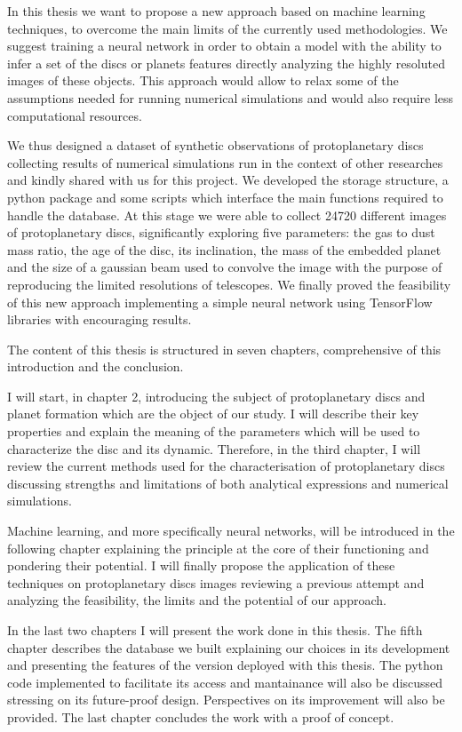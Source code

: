 \documentclass[a4paper,10pt]{report}
\begin{document}
In this thesis we want to propose a new approach based on machine learning techniques, to overcome 
the main limits of the currently used methodologies. We suggest training a neural network
in order to obtain a model with the ability to infer a set of the discs or planets features directly
analyzing the highly resoluted images of these objects. This approach would allow 
to relax some of the assumptions needed for running numerical simulations and would also require 
less computational resources.

We thus designed a dataset of synthetic observations of protoplanetary discs collecting
results of numerical simulations run in the context of other researches and kindly shared with us
for this project. We developed the storage structure, a python package and some scripts which interface 
the main functions required to handle the database. At this stage we were able to collect 24720 different images 
of protoplanetary discs, significantly exploring five parameters: the gas to dust mass ratio, the age of the disc, its inclination, the mass of
the embedded planet and the size of a 
gaussian beam used to convolve the image with the purpose of reproducing the limited resolutions
of telescopes.
We finally proved the feasibility of this new approach implementing 
a simple neural network using TensorFlow libraries with encouraging results.

The content of this thesis is structured in seven chapters, comprehensive of this introduction and
the conclusion.

I will start, in chapter 2, introducing the subject of protoplanetary discs and planet formation which 
are the object of our study. I will describe their key properties and explain the meaning of the parameters 
which will be used to characterize the disc and its dynamic. Therefore, in the third chapter, I will review the current 
methods used for the characterisation of protoplanetary discs discussing strengths and limitations
of both analytical expressions and numerical simulations.

Machine learning, and more specifically neural networks, will 
be introduced in the following chapter explaining the principle at the core of their functioning and pondering 
their potential. I will finally propose the application of these techniques on protoplanetary discs images
reviewing a previous attempt \citep{Auddy_2020} and analyzing the feasibility, the limits and the potential of our approach.

In the last two chapters I will present the work done in this thesis. The fifth chapter describes the database we built
explaining our choices in its development and presenting the features of the version deployed with this thesis.
The python code implemented to facilitate its access and mantainance will also be discussed stressing on its future-proof design.
Perspectives on its improvement will also be provided.
The last chapter concludes the work with a proof of concept.
\end{document}
